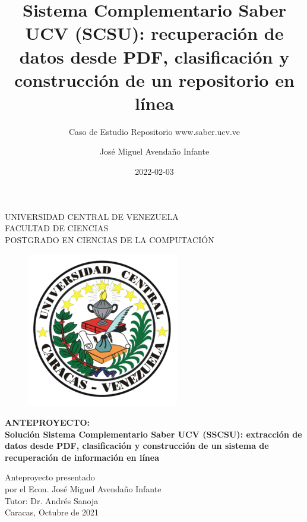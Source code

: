 \documentclass[
  10,
  spanish,
  openany]{book}
\title{Sistema Complementario Saber UCV (SCSU): recuperación de datos desde PDF, clasificación y construcción de un repositorio en línea}
\subtitle{Caso de Estudio Repositorio www.saber.ucv.ve}
\author{José Miguel Avendaño Infante}
\date{2022-02-03}
\begin{document}
\maketitle


\begin{center}
	UNIVERSIDAD CENTRAL DE VENEZUELA\\
	FACULTAD DE CIENCIAS\\
	POSTGRADO EN CIENCIAS DE LA COMPUTACI\'ON\\

	\begin{figure}
						\centering
						  \includegraphics[height=.7\textwidth]{images/UCV.png}
  \end{figure}
  \vspace{1.5cm}
  \large{\textbf{ANTEPROYECTO:\\ Solución Sistema Complementario Saber UCV (SSCSU): extracción de datos desde PDF, clasificación y construcción de un sistema de recuperación de información en línea}}

  \vspace{3cm}
  Anteproyecto presentado  \\
  por el Econ. José Miguel Avendaño Infante\\
  Tutor: Dr. Andrés Sanoja\\
  \vspace{1.5cm}
  Caracas, Octubre de 2021
\end{center}




\end{document}
